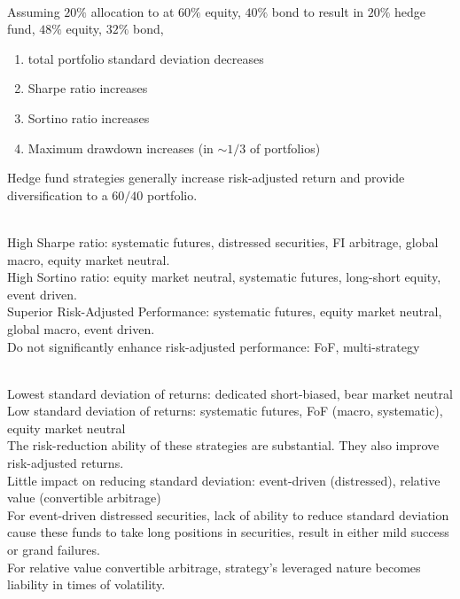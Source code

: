 \begin{remark} \\
Assuming $20\%$ allocation to at $60\%$ equity, $40\%$ bond to result in $20\%$ hedge fund, $48\%$ equity, $32\%$ bond,
\begin{enumerate}[label=\arabic*.]
\setlength{\itemsep}{0pt}
\item total portfolio standard deviation decreases
\item Sharpe ratio increases
\item Sortino ratio increases
\item Maximum drawdown increases (in $\sim 1/3$ of portfolios)
\end{enumerate}
Hedge fund strategies generally increase risk-adjusted return and provide diversification to a $60/40$ portfolio.
\end{remark}

\begin{remark} \\
High Sharpe ratio: systematic futures, distressed securities, FI arbitrage, global macro, equity market neutral.\\
High Sortino ratio: equity market neutral, systematic futures, long-short equity, event driven.\\
Superior Risk-Adjusted Performance: systematic futures, equity market neutral, global macro, event driven.\\
Do not significantly enhance risk-adjusted performance: FoF, multi-strategy
\end{remark}

\begin{remark} \\
Lowest standard deviation of returns: dedicated short-biased, bear market neutral\\
Low standard deviation of returns: systematic futures, FoF (macro, systematic), equity market neutral\\
The risk-reduction ability of these strategies are substantial. They also improve risk-adjusted returns.\\
Little impact on reducing standard deviation: event-driven (distressed), relative value (convertible arbitrage)\\
For event-driven distressed securities, lack of ability to reduce standard deviation cause these funds to take long positions in securities, result in either mild success or grand failures.\\
For relative value convertible arbitrage, strategy's leveraged nature becomes liability in times of volatility.
\end{remark}

